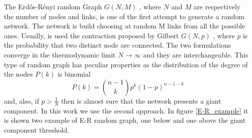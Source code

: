 The Erd\H{o}s-Rényi random Graph $G(N,M)$ \cite{erdos-renyi1960}, where $N$ and $M$ are respectively the number of nodes and links, is one of the first attempt to generate a random network. The network is build choosing at random M links from all the possible ones. Usually, is used the contraction proposed by Gilbert $G(N,p)$ \cite{gilbert} , where $p$ is the probability that two distinct node are connected. The two formulations converge in the thermodynamic limit $N \rightarrow \infty$ and they are interchangeable.
This type of random graph has peculiar properties as the distribution of the degree of the nodes $P(k)$  is binomial
\begin{equation}
    P(k) = \binom{n-1}{k}p^k(1-p)^{n-1-k}
\end{equation} 
and, also, if $p > \frac{1}{N}$ then is almost sure that the network presents a giant component.
In this work we use the second approach. In figure \ref{E-R_example} it is shown two example of E-R random graph, one below and one above the giant component threshold.

